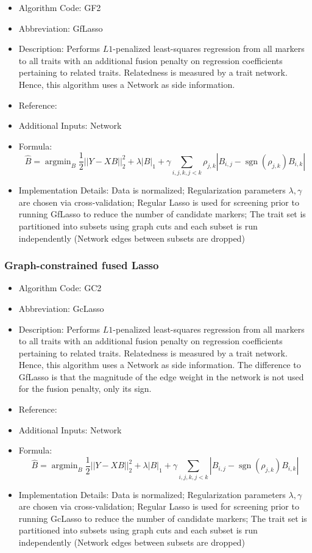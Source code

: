 \documentclass{article}
\newcommand{\sgn}{\operatorname{sgn}}
\newcommand{\argmin}{\operatorname{argmin}}
\begin{document}
\begin{itemize}
\item Algorithm Code: GF2
\item Abbreviation: GfLasso
\item Description: Performs $L1$-penalized least-squares regression from all markers to all traits with an additional fusion penalty on regression coefficients pertaining to related traits. Relatedness is measured by a trait network. Hence, this algorithm uses a Network as side information. 
\item Reference: \cite{GfLasso}
\item Additional Inputs: Network
\item Formula:
\begin{equation*}
\hat{B} = \argmin_{B} \frac{1}{2}||Y - XB||_2^2 + \lambda|B|_1 + \gamma\sum_{i,j,k, j < k}\rho_{j,k}|B_{i,j} - \sgn(\rho_{j,k})B_{i,k}|
\end{equation*}
\item Implementation Details: Data is normalized; Regularization parameters $\lambda, \gamma$ are chosen via cross-validation; Regular Lasso is used for screening prior to running GfLasso to reduce the number of candidate markers; The trait set is partitioned into subsets using graph cuts and each subset is run independently (Network edges between subsets are dropped)

\end{itemize}

\subsubsection{Graph-constrained fused Lasso}

\begin{itemize}
\item Algorithm Code: GC2
\item Abbreviation: GcLasso
\item Description: Performs $L1$-penalized least-squares regression from all markers to all traits with an additional fusion penalty on regression coefficients pertaining to related traits. Relatedness is measured by a trait network. Hence, this algorithm uses a Network as side information. The difference to GfLasso is that the magnitude of the edge weight in the network is not used for the fusion penalty, only its sign.
\item Reference: \cite{GfLasso}
\item Additional Inputs: Network
\item Formula:
\begin{equation*}
\hat{B} = \argmin_{B} \frac{1}{2}||Y - XB||_2^2 + \lambda|B|_1 + \gamma\sum_{i,j,k, j < k}|B_{i,j} - \sgn(\rho_{j,k})B_{i,k}|
\end{equation*}
\item Implementation Details: Data is normalized; Regularization parameters $\lambda, \gamma$ are chosen via cross-validation; Regular Lasso is used for screening prior to running GcLasso to reduce the number of candidate markers; The trait set is partitioned into subsets using graph cuts and each subset is run independently (Network edges between subsets are dropped)
\end{itemize}
\end{document}
